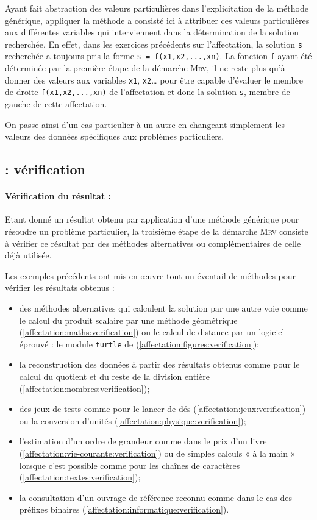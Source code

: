 Ayant fait abstraction des valeurs particulières dans l'explicitation 
de la méthode générique, appliquer la méthode a consisté ici à attribuer
ces valeurs particulières aux différentes variables qui interviennent 
dans la détermination de la solution recherchée. 
En effet, dans les exercices précédents sur l'affectation,
la solution \texttt{s} recherchée a toujours pris la forme
\texttt{s = f(x1,x2,...,xn)}. La fonction \texttt{f}
ayant été déterminée par la première étape de la démarche \textsc{Mrv},
il ne reste plus qu'à donner des valeurs aux variables \texttt{x1}, \texttt{x2}\ldots{} 
pour être capable d'évaluer le membre de droite \texttt{f(x1,x2,...,xn)} de l'affectation
et donc la solution \texttt{s}, membre de gauche de cette affectation.

On passe ainsi d'un cas particulier à un autre en changeant simplement les valeurs
des données spécifiques aux problèmes particuliers.

\subsection{\mrv : vérification}\label{affectation:retours:verification}

\paragraph{Vérification du résultat :}
Etant donné un résultat obtenu par application d'une méthode générique pour résoudre un problème particulier, la troisième étape de la démarche \textsc{Mrv} consiste à vérifier ce résultat
par des méthodes alternatives ou complémentaires de celle déjà utilisée.

Les exemples précédents ont mis en \oe uvre tout un éventail de méthodes pour vérifier
les résultats obtenus :
\begin{itemize}
\item des méthodes alternatives qui calculent la solution
	par une autre voie comme 
	le calcul du produit scalaire par une méthode géométrique 
	(\ref{affectation:maths:verification}) ou
	le calcul de distance par un logiciel éprouvé :
	le module \texttt{turtle} de \python{} (\ref{affectation:figures:verification});
\item la reconstruction des données à partir des résultats obtenus
	comme pour le calcul du quotient et du reste de la division entière
	(\ref{affectation:nombres:verification});
\item des jeux de tests comme pour 
	le lancer de dés (\ref{affectation:jeux:verification}) ou 
	la conversion d'unités (\ref{affectation:physique:verification});
\item l'estimation d'un ordre de grandeur comme dans 
	le prix d'un livre (\ref{affectation:vie-courante:verification})
	ou de simples calculs « à la main » lorsque c'est possible
	comme pour les chaînes de caractères (\ref{affectation:textes:verification});
\item la consultation d'un ouvrage de référence reconnu comme dans le cas 
	des préfixes binaires (\ref{affectation:informatique:verification}).
\end{itemize}


